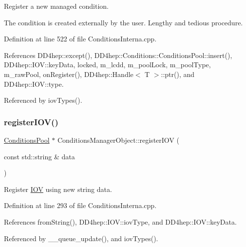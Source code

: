 Register a new managed condition. 

The condition is created externally by the user. Lengthy and tedious procedure. 

Definition at line 522 of file Conditions\+Interna.\+cpp.



References D\+D4hep\+::except(), D\+D4hep\+::\+Conditions\+::\+Conditions\+Pool\+::insert(), D\+D4hep\+::\+I\+O\+V\+::key\+Data, locked, m\+\_\+lcdd, m\+\_\+pool\+Lock, m\+\_\+pool\+Type, m\+\_\+raw\+Pool, on\+Register(), D\+D4hep\+::\+Handle$<$ T $>$\+::ptr(), and D\+D4hep\+::\+I\+O\+V\+::type.



Referenced by iov\+Types().

\hypertarget{class_d_d4hep_1_1_conditions_1_1_conditions_manager_object_a5843d64a9285d2f40f636e6d91020bf0}{}\label{class_d_d4hep_1_1_conditions_1_1_conditions_manager_object_a5843d64a9285d2f40f636e6d91020bf0} 
\subsubsection{\texorpdfstring{register\+I\+O\+V()}{registerIOV()}\hspace{0.1cm}{\footnotesize\ttfamily [1/2]}}
{\footnotesize\ttfamily \hyperlink{class_d_d4hep_1_1_conditions_1_1_conditions_pool}{Conditions\+Pool} $\ast$ Conditions\+Manager\+Object\+::register\+I\+OV (\begin{DoxyParamCaption}\item[{const std\+::string \&}]{data }\end{DoxyParamCaption})}



Register \hyperlink{class_d_d4hep_1_1_i_o_v}{I\+OV} using new string data. 



Definition at line 293 of file Conditions\+Interna.\+cpp.



References from\+String(), D\+D4hep\+::\+I\+O\+V\+::iov\+Type, and D\+D4hep\+::\+I\+O\+V\+::key\+Data.



Referenced by \+\_\+\+\_\+queue\+\_\+update(), and iov\+Types().

